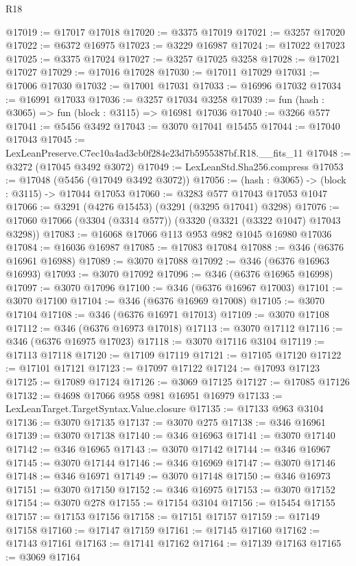 \begin{lexlean}{R18}
\begin{coremodule}
@17019 := @17017 @17018
@17020 := @3375 @17019
@17021 := @3257 @17020
@17022 := @6372 @16975
@17023 := @3229 @16987
@17024 := @17022 @17023
@17025 := @3375 @17024
@17027 := @3257 @17025 @3258
@17028 := @17021 @17027
@17029 := @17016 @17028
@17030 := @17011 @17029
@17031 := @17006 @17030
@17032 := @17001 @17031
@17033 := @16996 @17032
@17034 := @16991 @17033
@17036 := @3257 @17034 @3258
@17039 := fun (hash : @3065) => fun (block : @3115) => @16981 @17036
@17040 := @3266 @577
@17041 := @5456 @3492
@17043 := @3070 @17041 @15455
@17044 := @17040 @17043
@17045 := LexLeanPreserve.C7ec10a4ad3cb0f284e23d7b5955387bf.R18.__fits_11
@17048 := @3272 (@17045 @3492 @3072)
@17049 := LexLeanStd.Sha256.compress
@17053 := @17048 (@5456 (@17049 @3492 @3072))
@17056 := (hash : @3065) -> (block : @3115) -> @17044 @17053
@17060 := @3283 @577 @17043 @17053 @1047
@17066 := @3291 (@4276 @15453) (@3291 (@3295 @17041) @3298)
@17076 := @17060 @17066 (@3304 (@3314 @577)) (@3320 (@3321 (@3322 @1047) @17043 @3298))
@17083 := @16068 @17066 @113 @953 @982 @1045 @16980 @17036
@17084 := @16036 @16987
@17085 := @17083 @17084
@17088 := @346 (@6376 @16961 @16988)
@17089 := @3070 @17088
@17092 := @346 (@6376 @16963 @16993)
@17093 := @3070 @17092
@17096 := @346 (@6376 @16965 @16998)
@17097 := @3070 @17096
@17100 := @346 (@6376 @16967 @17003)
@17101 := @3070 @17100
@17104 := @346 (@6376 @16969 @17008)
@17105 := @3070 @17104
@17108 := @346 (@6376 @16971 @17013)
@17109 := @3070 @17108
@17112 := @346 (@6376 @16973 @17018)
@17113 := @3070 @17112
@17116 := @346 (@6376 @16975 @17023)
@17118 := @3070 @17116 @3104
@17119 := @17113 @17118
@17120 := @17109 @17119
@17121 := @17105 @17120
@17122 := @17101 @17121
@17123 := @17097 @17122
@17124 := @17093 @17123
@17125 := @17089 @17124
@17126 := @3069 @17125
@17127 := @17085 @17126
@17132 := @4698 @17066 @958 @981 @16951 @16979
@17133 := LexLeanTarget.TargetSyntax.Value.closure
@17135 := @17133 @963 @3104
@17136 := @3070 @17135
@17137 := @3070 @275
@17138 := @346 @16961
@17139 := @3070 @17138
@17140 := @346 @16963
@17141 := @3070 @17140
@17142 := @346 @16965
@17143 := @3070 @17142
@17144 := @346 @16967
@17145 := @3070 @17144
@17146 := @346 @16969
@17147 := @3070 @17146
@17148 := @346 @16971
@17149 := @3070 @17148
@17150 := @346 @16973
@17151 := @3070 @17150
@17152 := @346 @16975
@17153 := @3070 @17152
@17154 := @3070 @278
@17155 := @17154 @3104
@17156 := @15454 @17155
@17157 := @17153 @17156
@17158 := @17151 @17157
@17159 := @17149 @17158
@17160 := @17147 @17159
@17161 := @17145 @17160
@17162 := @17143 @17161
@17163 := @17141 @17162
@17164 := @17139 @17163
@17165 := @3069 @17164

\end{coremodule}
\end{lexlean}
